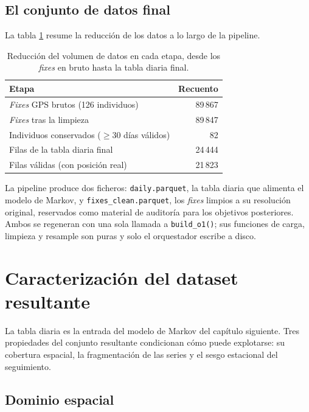 \subsection{El conjunto de datos final}
\label{sec:o1-dataset-final}

La tabla \ref{tab:o1-funnel} resume la reducción de los datos a lo largo de la
pipeline.

\begin{table}[H]
  \centering
  \caption[Reducción de los datos a lo largo de la pipeline]{Reducción del volumen
  de datos en cada etapa, desde los \textit{fixes} en bruto hasta la tabla diaria
  final.}
  \label{tab:o1-funnel}
  \begin{tabular}{lr}
    \toprule
    \textbf{Etapa} & \textbf{Recuento} \\
    \midrule
    \textit{Fixes} GPS brutos (126 individuos) & 89\,867 \\
    \textit{Fixes} tras la limpieza & 89\,847 \\
    Individuos conservados ($\geq 30$ días válidos) & 82 \\
    Filas de la tabla diaria final & 24\,444 \\
    Filas válidas (con posición real) & 21\,823 \\
    \bottomrule
  \end{tabular}
\end{table}

La pipeline produce dos ficheros: \texttt{daily.parquet}, la tabla diaria que
alimenta el modelo de Markov, y \texttt{fixes\_clean.parquet}, los \textit{fixes}
limpios a su resolución original, reservados como material de auditoría para los
objetivos posteriores. Ambos se regeneran con una sola llamada a
\texttt{build\_o1()}; sus funciones de carga, limpieza y resample son puras y solo
el orquestador escribe a disco.

\section{Caracterización del dataset resultante}
\label{sec:o1-resultante}

La tabla diaria es la entrada del modelo de Markov del capítulo siguiente. Tres
propiedades del conjunto resultante condicionan cómo puede explotarse: su cobertura
espacial, la fragmentación de las series y el sesgo estacional del seguimiento.

\subsection{Dominio espacial}
\label{sec:o1-espacial}

